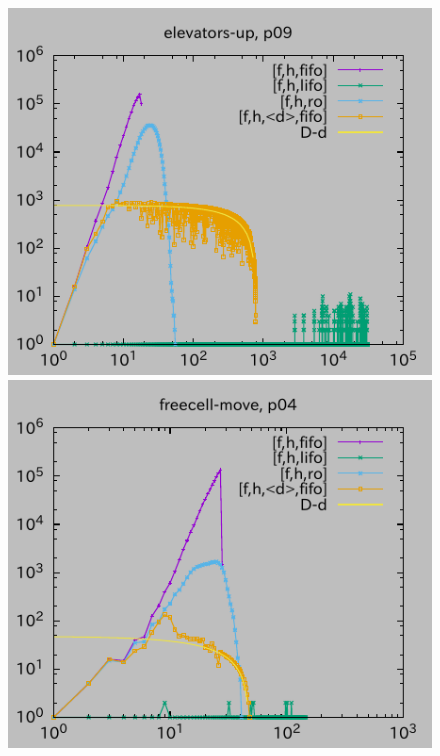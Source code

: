 \begin{figure}[tb]
\includegraphics{img/depth/elevators-up/p09.pdf}
\includegraphics{img/depth/freecell-move/p04.pdf}

\end{figure}
